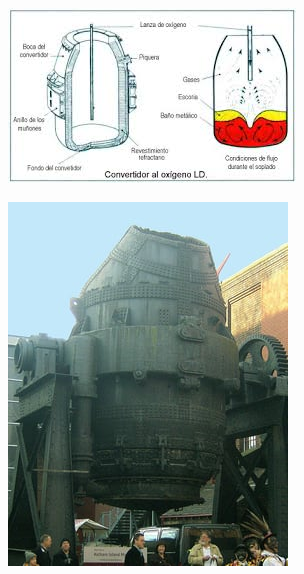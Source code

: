 \documentclass[12pt,a4paper]{article}
\begin{document}
\begin{figure}
\begin{subfigure}{0.45\textwidth}
        \includegraphics[width=\textwidth]{Inagenes para latex/bof1.png}
        \label{LD}
    \end{subfigure}
    \hfill
    \begin{subfigure}{0.45\textwidth}
        \centering
        \includegraphics[width=\textwidth]{Inagenes para latex/convertidor tamas.png}
        \label{thomas}


\end{subfigure}
\end{figure}
\end{document}
